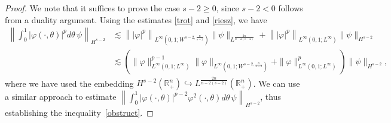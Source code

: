 \documentclass[preprint,compress,12pt]{elsarticle}
\numberwithin{equation}{section}
\begin{document}
\begin{proof}
	We note that it suffices to prove the case $s-2\geq0$, since $s-2<0$ follows from a duality argument. Using the estimates \eqref{trot} and \eqref{riesz}, we have
	\begin{equation*}
		\begin{aligned}
			\left\|\int_{0}^{1}|\varphi(\cdot,\theta)|^{p}d\theta\, \psi\right\|_{H^{s-2}}&\lesssim \left\||\varphi|^{p}\right\|_{L^{\infty}(0,1;W^{s-2,\frac{n}{s-2}})}\|\psi\|_{L^{\frac{2n}{n-2(s-2)}}}+\left\||\varphi|^{p}\right\|_{L^{\infty}(0,1;L^{\infty})} \|\psi\|_{H^{s-2}}\\
			&\lesssim \left(\|\varphi\|^{p-1}_{L^{\infty}(0,1;L^{\infty})}\|\varphi\|_{L^{\infty}(0,1;W^{s-2,\frac{n}{s-2}})}+\|\varphi\|^{p}_{L^{\infty}(0,1;L^{\infty})} \right)\|\psi\|_{H^{s-2}},
		\end{aligned}
	\end{equation*}
	where we have used the embedding $H^{s-2}(\mathbb{R}_{+}^{n})\hookrightarrow L^{\frac{2n}{n-2(s-2)}}(\mathbb{R}_{+}^{n})$.
	We can use a similar approach to estimate $\left\|\int_{0}^{1}|\varphi(\cdot,\theta)|^{p-2} \varphi^{2}(\cdot,\theta) d\theta\, \psi\right\|_{H^{s-2}}$, thus establishing the inequality~\eqref{obstruct}.
\end{proof}
\end{document}
